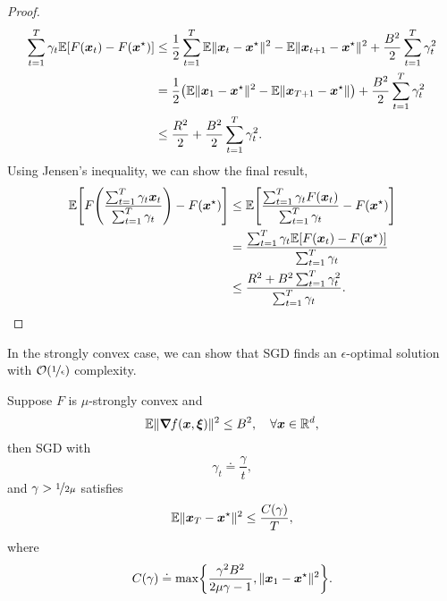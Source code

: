 \begin{proof}
\begin{align*}
        \sum_{t=1}^{T} \gamma_t \E[F(\vec{x}_t) - F(\vec{x}^\star)] & \leq \frac{1}{2} \sum_{t=1}^{T} \E \| \vec{x}_t - \vec{x}^\star \|^2 - \E \| \vec{x}_{t+1} - \vec{x}^\star \|^2 + \frac{B^2}{2} \sum_{t=1}^{T} \gamma_t^2 \\
                                                                    & = \frac{1}{2} \lft( \E \| \vec{x}_1 - \vec{x}^\star \|^2 - \E \| \vec{x}_{T+1} - \vec{x}^\star \| \rgt) + \frac{B^2}{2} \sum_{t=1}^{T} \gamma_t^2         \\
                                                                    & \leq \frac{R^2}{2} + \frac{B^2}{2} \sum_{t=1}^{T} \gamma_t^2.
    \end{align*}
    Using Jensen's inequality, we can show the final result,
    \begin{align*}
        \E \lft[F \lft( \frac{\sum_{t=1}^{T} \gamma_t \vec{x}_t}{\sum_{t=1}^{T} \gamma_t} \rgt) - F(\vec{x}^\star) \rgt] & \leq \E \lft[ \frac{\sum_{t=1}^{T} \gamma_t F(\vec{x}_t)}{\sum_{t=1}^{T} \gamma_t} - F(\vec{x}^\star) \rgt] \\
                                                                                                                         & = \frac{\sum_{t=1}^{T} \gamma_t \E[F(\vec{x}_t) - F(\vec{x}^\star)]}{\sum_{t=1}^{T} \gamma_t}               \\
                                                                                                                         & \leq \frac{R^2 + B^2 \sum_{t=1}^{T} \gamma_t^2}{\sum_{t=1}^{T} \gamma_t}.
    \end{align*}
\end{proof}

In the strongly convex case, we can show that SGD finds an $\epsilon$-optimal solution with
$\bigo{\nicefrac{1}{\epsilon}}$ complexity.

\begin{theorem}
    Suppose $F$ is $\mu$-strongly convex and \[
        \mathbb{E} \| \bm{\nabla}_{\! } f(\bm{x}, \bm{\xi}) \|^2 \leq B^2, \quad \forall \bm{x} \in \mathbb{R}^d,
    \]
    then SGD with \[
        \gamma_t \doteq \frac{\gamma}{t},
    \]
    and $\gamma > \nicefrac{1}{2 \mu}$ satisfies \[
        \mathbb{E} \| \bm{x}_T - \bm{x}^\star \|^2 \leq \frac{C(\gamma)}{T},
    \]
    where \[
        C(\gamma) \doteq \max \lft\{ \frac{\gamma^2 B^2}{2 \mu \gamma - 1}, \| \vec{x}_1 - \vec{x}^\star \|^2 \rgt\}.
    \]
\end{theorem}

